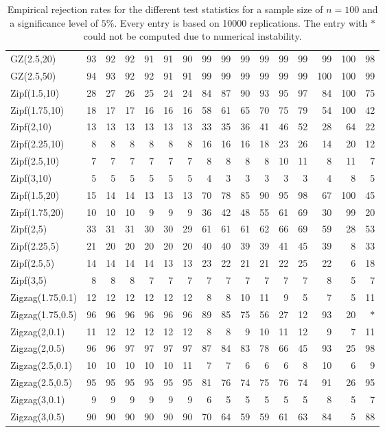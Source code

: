 \documentclass{article}
\theoremstyle{thm}
\theoremstyle{def}
\begin{document}
\begin{table}[t]
\begin{tabular}{l|rrrrrrrrrrrrrrr}
  GZ(2.5,20) & 93 & 92 & 92 & 91 & 91 & 90 & 99 & 99 & 99 & 99 & 99 & 99 & 99 & 100 & 98 \\
  GZ(2.5,50) & 94 & 93 & 92 & 92 & 91 & 91 & 99 & 99 & 99 & 99 & 99 & 99 & 100 & 100 & 99 \\
  Zipf(1.5,10) & 28 & 27 & 26 & 25 & 24 & 24 & 84 & 87 & 90 & 93 & 95 & 97 & 84 & 100 & 75 \\
  Zipf(1.75,10) & 18 & 17 & 17 & 16 & 16 & 16 & 58 & 61 & 65 & 70 & 75 & 79 & 54 & 100 & 42 \\
  Zipf(2,10) & 13 & 13 & 13 & 13 & 13 & 13 & 33 & 35 & 36 & 41 & 46 & 52 & 28 & 64 & 22 \\
  Zipf(2.25,10) & 8 & 8 & 8 & 8 & 8 & 8 & 16 & 16 & 16 & 18 & 23 & 26 & 14 & 20 & 12 \\
  Zipf(2.5,10) & 7 & 7 & 7 & 7 & 7 & 7 & 8 & 8 & 8 & 8 & 10 & 11 & 8 & 11 & 7 \\
  Zipf(3,10) & 5 & 5 & 5 & 5 & 5 & 5 & 4 & 3 & 3 & 3 & 3 & 3 & 4 & 8 & 5 \\
  Zipf(1.5,20) & 15 & 14 & 14 & 13 & 13 & 13 & 70 & 78 & 85 & 90 & 95 & 98 & 67 & 100 & 45 \\
  Zipf(1.75,20) & 10 & 10 & 10 & 9 & 9 & 9 & 36 & 42 & 48 & 55 & 61 & 69 & 30 & 99 & 20 \\
  Zipf(2,5) & 33 & 31 & 31 & 30 & 30 & 29 & 61 & 61 & 61 & 62 & 66 & 69 & 59 & 28 & 53 \\
  Zipf(2.25,5) & 21 & 20 & 20 & 20 & 20 & 20 & 40 & 40 & 39 & 39 & 41 & 45 & 39 & 8 & 33 \\
  Zipf(2.5,5) & 14 & 14 & 14 & 14 & 13 & 13 & 23 & 22 & 21 & 21 & 22 & 25 & 22 & 6 & 18 \\
  Zipf(3,5) & 8 & 8 & 8 & 7 & 7 & 7 & 7 & 7 & 7 & 7 & 7 & 7 & 8 & 5 & 7 \\
  Zigzag(1.75,0.1) & 12 & 12 & 12 & 12 & 12 & 12 & 8 & 8 & 10 & 11 & 9 & 5 & 7 & 5 & 11 \\
  Zigzag(1.75,0.5) & 96 & 96 & 96 & 96 & 96 & 96 & 89 & 85 & 75 & 56 & 27 & 12 & 93 & 20 & $\ast$\\
  Zigzag(2,0.1) & 11 & 12 & 12 & 12 & 12 & 12 & 8 & 8 & 9 & 10 & 11 & 12 & 9 & 7 & 11 \\
  Zigzag(2,0.5) & 96 & 96 & 97 & 97 & 97 & 97 & 87 & 84 & 83 & 78 & 66 & 45 & 93 & 25 & 98 \\
  Zigzag(2.5,0.1) & 10 & 10 & 10 & 10 & 10 & 11 & 7 & 7 & 6 & 6 & 6 & 8 & 10 & 6 & 9 \\
  Zigzag(2.5,0.5) & 95 & 95 & 95 & 95 & 95 & 95 & 81 & 76 & 74 & 75 & 76 & 74 & 91 & 26 & 95 \\
  Zigzag(3,0.1) & 9 & 9 & 9 & 9 & 9 & 9 & 6 & 5 & 5 & 5 & 5 & 5 & 8 & 5 & 7 \\
  Zigzag(3,0.5) & 90 & 90 & 90 & 90 & 90 & 90 & 70 & 64 & 59 & 59 & 61 & 63 & 84 & 5 & 88 \\
\end{tabular}
\caption{Empirical rejection rates for the different test statistics for a sample size of $n=100$ and a significance level of $5\%$. Every entry is based on 10000 replications. The entry with $\ast$ could not be computed due to numerical instability.}\label{tab:100}
\end{table}
\end{document}
